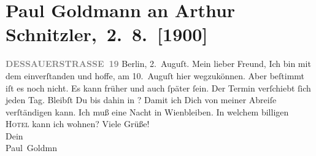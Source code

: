 

         
         \renewcommand{\erwaehntePersonen}{Personen: Alfred Kerr}
         \renewcommand{\erwaehnteOrte}{Orte: Bad Ischl, Berlin, Dessauer Straße, Toblach, Wien}
         \renewcommand{\erwaehnteWerke}{}
               \section[ Paul Goldmann an Arthur Schnitzler, 2. 8. {[}1900{]}]{ Paul Goldmann an Arthur Schnitzler, 2. 8. {[}1900{]}}\nopagebreak{}\rehead{ }\begin{ledgroupsized}[t]{13cm}\normalsize\beginnumbering \toendnotes[C]{\smallbreak\pagebreak[2]} 
\toendnotes[C]{\smallbreak}\pstart
           \noindent{}\raggedleft{}{\pb}\textcolor{gray}{\textbf{DESSAUERSTRASSE 19}}\pend
           \pstart
           Berlin, 2. Auguſt.\pend
           \pstart\center{}Mein lieber Freund,\pend\pstart
           Ich bin mit dem \label{K_L02926-1v}\label{K_L02926-1h} einverſtanden und hoffe, am 10. Auguſt hier
               wegzukönnen. Aber beſtimmt iſt es noch nicht.  Es
               kann früher und auch ſpäter ſein. Der Termin verſchiebt ſich jeden Tag. Bleibſt Du
               bis dahin in \label{K_L02926-2v}\label{K_L02926-2h}? Damit ich Dich von meiner
               Abreiſe verſtändigen kann.\pend
           \pstart
           Ich muß eine Nacht in Wienbleiben. In welchem billigen \textsc{Hotel} kann ich wohnen?\pend
           \pstart
           Viele Grüße! {\\[\baselineskip]}Dein {\\[\baselineskip]}\spacefill\mbox{Paul Goldmn}\pend

\end{ledgroupsized}

